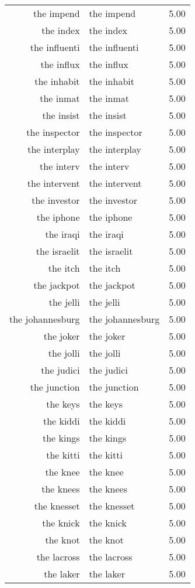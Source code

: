 \begin{table}[ht]
\begin{tabular}{rlr}
  the impend & the impend & 5.00 \\ 
  the index & the index & 5.00 \\ 
  the influenti & the influenti & 5.00 \\ 
  the influx & the influx & 5.00 \\ 
  the inhabit & the inhabit & 5.00 \\ 
  the inmat & the inmat & 5.00 \\ 
  the insist & the insist & 5.00 \\ 
  the inspector & the inspector & 5.00 \\ 
  the interplay & the interplay & 5.00 \\ 
  the interv & the interv & 5.00 \\ 
  the intervent & the intervent & 5.00 \\ 
  the investor & the investor & 5.00 \\ 
  the iphone & the iphone & 5.00 \\ 
  the iraqi & the iraqi & 5.00 \\ 
  the israelit & the israelit & 5.00 \\ 
  the itch & the itch & 5.00 \\ 
  the jackpot & the jackpot & 5.00 \\ 
  the jelli & the jelli & 5.00 \\ 
  the johannesburg & the johannesburg & 5.00 \\ 
  the joker & the joker & 5.00 \\ 
  the jolli & the jolli & 5.00 \\ 
  the judici & the judici & 5.00 \\ 
  the junction & the junction & 5.00 \\ 
  the keys & the keys & 5.00 \\ 
  the kiddi & the kiddi & 5.00 \\ 
  the kings & the kings & 5.00 \\ 
  the kitti & the kitti & 5.00 \\ 
  the knee & the knee & 5.00 \\ 
  the knees & the knees & 5.00 \\ 
  the knesset & the knesset & 5.00 \\ 
  the knick & the knick & 5.00 \\ 
  the knot & the knot & 5.00 \\ 
  the lacross & the lacross & 5.00 \\ 
  the laker & the laker & 5.00 \\ 

\end{tabular}
\end{table}
